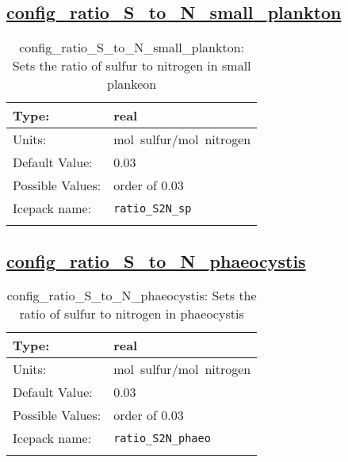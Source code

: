 \subsection[config\_ratio\_S\_to\_N\_small\_plankton]{\hyperref[sec:nm_tab_biogeochemistry]{config\_ratio\_S\_to\_N\_small\_plankton}}
\label{subsec:nm_sec_config_ratio_S_to_N_small_plankton}
\begin{center}
\begin{longtable}{| p{2.0in} || p{4.0in} |}
    \hline
    Type: & real \\
    \hline
    Units: & \si{mol.sulfur/mol.nitrogen} \\
    \hline
    Default Value: & 0.03 \\
    \hline
    Possible Values: & order of 0.03 \\
    \hline
    Icepack name: & \verb+ratio_S2N_sp+ \\
    \hline
    \caption{config\_ratio\_S\_to\_N\_small\_plankton: Sets the ratio of sulfur to nitrogen in small plankeon}
\end{longtable}
\end{center}
\subsection[config\_ratio\_S\_to\_N\_phaeocystis]{\hyperref[sec:nm_tab_biogeochemistry]{config\_ratio\_S\_to\_N\_phaeocystis}}
\label{subsec:nm_sec_config_ratio_S_to_N_phaeocystis}
\begin{center}
\begin{longtable}{| p{2.0in} || p{4.0in} |}
    \hline
    Type: & real \\
    \hline
    Units: & \si{mol.sulfur/mol.nitrogen} \\
    \hline
    Default Value: & 0.03 \\
    \hline
    Possible Values: & order of 0.03 \\
    \hline
    Icepack name: & \verb+ratio_S2N_phaeo+ \\
    \hline
    \caption{config\_ratio\_S\_to\_N\_phaeocystis: Sets the ratio of sulfur to nitrogen in phaeocystis}
\end{longtable}
\end{center}
